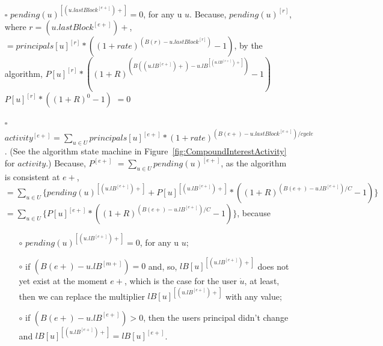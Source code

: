 \documentclass{article}
\begin{document}
\begin{itemize}
\begin{itemize}
    \item[$\square$] $pending(u)^{[(u.lastBlock^{[e+]})+]} = 0$, for any u $u$.
    \newline \newline
    Because, $pending(u)^{[r]}$, where $r = (u.lastBlock^{[e+]})+$,
    \newline \newline
    $ = principals[u]^{[r]} * ((1+rate)^{(B(r) - u.lastBlock^{[r]})}-1) $, by the algorithm,
    \newline \newline 
    $ P[u]^{[r]} * ((1+R)^{(B((u.lB^{[e+]})+) - u.lB^{[(u.lB^{[e+]})+]})}-1) $
    \newline \newline 
    $ P[u]^{[r]} * ((1+R)^{0}-1) $
    \newline \newline 
    $ = 0 $
    \newline
    \item[$\square$] $ activity^{[e+]} = \sum_{u \in U} principals[u]^{[e+]} * (1+rate )^{(B(e+)-u.lastBlock^{[e+]})/cycle}$.
    \newline
    (See the algorithm state machine in Figure~\ref{fig:CompoundInterestActivity} for $activity$.)
    \newline \newline
    Because, {$ P^{[e+]} $}
    \newline \newline
    $ = \sum_{u \in U} pending(u)^{[e+]} $, as the algorithm is consistent at $e+$,
    \newline \newline
    $ = \sum_{u \in U} \{ pending(u)^{[(u.lB^{[e+]})+]} 
    + P[u]^{[(u.lB^{[e+]})+]} * ( (1+R )^{(B(e+)-u.lB^{[e+]})/C} - 1) \}$
    \newline \newline
    $ = \sum_{u \in U} \{ P[u]^{[e+]} * ( (1+R )^{(B(e+)-u.lB^{[e+]})/C} - 1) \}$,
    \newline \newline
    because \\
    \begin{itemize}
      \item[$\circ$] $pending(u)^{[(u.lB^{[e+]})+]} = 0$, for any u $u$; \newline
      \item[$\circ$] if $(B(e+) - u.lB^{[m+]}) = 0$ and, so, $lB[u]^{[(u.lB^{[e+]})+]}$ \newline
      does not yet exist at the moment $e+$, which is the case for the user $\dot u$, at least, 
      then we can replace the multiplier $lB[u]^{[(u.lB^{[e+]})+]}$ with any value;
      \item[$\circ$] if $(B(e+) - u.lB^{[e+]}) > 0$, then the users principal didn't change and 
      $lB[u]^{[(u.lB^{[e+]})+]} = lB[u]^{[e+]}$. \newline
    \end{itemize}


\end{itemize}
\end{itemize}
\end{document}
